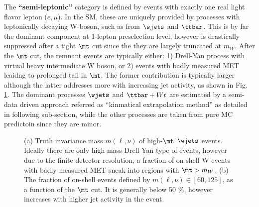 The \textbf{``semi-leptonic''} category is defined by events with exactly one real light flavor lepton ($e,\mu$). In the SM, these are uniquely provided by processes with leptonically decaying W-boson, such as from $\wjets$ and $\ttbar$. This is by far the dominant component at 1-lepton preselection level, however is drastically suppressed after a tight $\mt$ cut since the they are largely truncated at $m_{W}$. After the $\mt$ cut, the remnant events are typically either: 1) Drell-Yan process with virtual heavy intermediate W boson, or 2) events with badly measured MET leaidng to prolonged tail in $\mt$. The former contribution is typically larger although the latter addresses more with increasing jet activity, as shown in Fig. \ref{fig::BGestimation::Wmassline}. The dominant processes $\wjets$ and $\ttbar+Wt$ are estimated by a semi-data driven approach referred as ``kinmatical extrapolation method'' as detailed in following sub-section, while the other processes are taken from pure MC predictoin since they are minor. \\
\begin{figure}[h]
  \centering
    \caption{ (a) Truth invariance mass $m(\ell,\nu)$ of high-$\mt$ $\wjets$ events. Ideally there are only high-mass Drell-Yan type of events, however due to the finite detector resolution, a fraction of on-shell W events with badly measured MET sneak into regions with $\mt>m_W$. (b) The fraction of on-shell events defined by $m(\ell,\nu) \in [60,125]$, as a function of the $\mt$ cut. It is generally below 50 $\%$, however increases with higher jet activity in the event. \label{fig::BGestimation::Wmassline} }
\end{figure}

